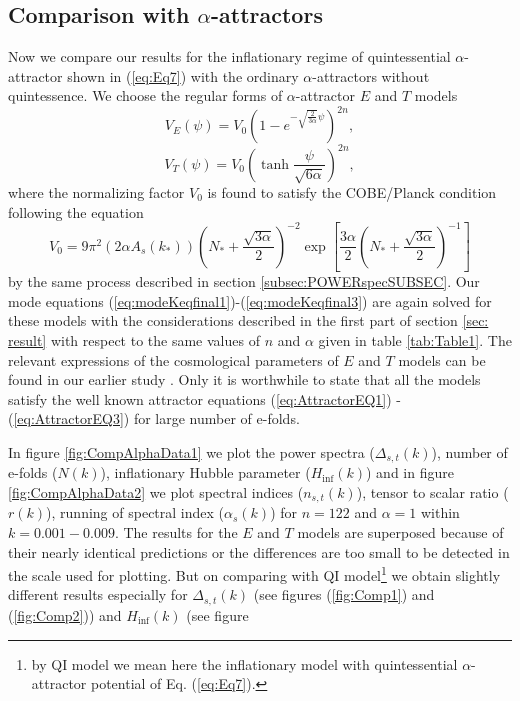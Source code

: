 \documentclass[a4paper,11pt]{article}
\begin{document}
\subsection{Comparison with \texorpdfstring{$\alpha$}{a}-attractors}
\label{subsec:Alphacomp}
Now we compare our results for the inflationary regime of quintessential $\alpha$-attractor shown in (\ref{eq:Eq7}) with the ordinary $\alpha$-attractors without quintessence. We choose the regular forms of $\alpha$-attractor $E$ and $T$ models
\begin{equation}
    V_E(\psi) = V_0\left(1-e^{-\sqrt{\frac{2}{3\alpha}}\psi}\right)^{2n},
\end{equation}
\begin{equation}
    V_T(\psi)=V_0\left(\tanh{\frac{\psi}{\sqrt{6\alpha}}}\right)^{2n},
\end{equation}
where the normalizing factor $V_0$ is found to satisfy the COBE/Planck condition following the equation
\begin{equation}
    V_0 = 9\pi^2 (2\alpha A_s(k_{*}))\left(N_{*}+\frac{\sqrt{3\alpha}}{2}\right)^{-2}\exp\left[\frac{3\alpha}{2}\left(N_{*}+\frac{\sqrt{3\alpha}}{2}\right)^{-1}\right]
\end{equation} by the same process described in section \ref{subsec:POWERspecSUBSEC}. Our mode equations (\ref{eq:modeKeqfinal1})-(\ref{eq:modeKeqfinal3}) are again solved for these models with the considerations described in the first part of section \ref{sec: result} with respect to the same values of $n$ and $\alpha$ given in table \ref{tab:Table1}. The relevant expressions of the cosmological parameters of $E$ and $T$ models can be found in our earlier study \cite{Sarkar:2021ird}. Only it is worthwhile to state that all the models satisfy the well known attractor equations (\ref{eq:AttractorEQ1}) - (\ref{eq:AttractorEQ3}) for large number of e-folds.\par In figure \ref{fig:CompAlphaData1} we plot the power spectra ($\Delta_{s,t}(k)$), number of e-folds ($N(k)$), inflationary Hubble parameter ($H_{\mathrm{inf}}(k)$) and in figure \ref{fig:CompAlphaData2} we plot spectral indices ($n_{s,t}(k)$), tensor to scalar ratio ($r(k)$), running of spectral index ($\alpha_s(k)$) for $n=122$ and $\alpha=1$ within $k=0.001-0.009$. The results for the $E$ and $T$ models are superposed because of their nearly identical predictions or the differences are too small to be detected in the scale used for plotting. But on comparing with QI model\footnote{by QI model we mean here the inflationary model with quintessential $\alpha$-attractor potential of Eq. (\ref{eq:Eq7}).} we obtain slightly different results especially for $\Delta_{s,t}(k)$ (see figures (\ref{fig:Comp1}) and (\ref{fig:Comp2})) and $H_{\mathrm{inf}}(k)$ (see figure
\end{document}
